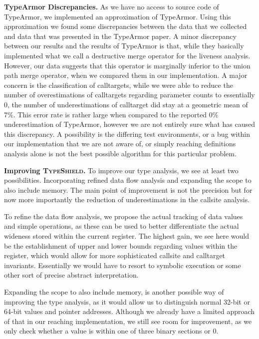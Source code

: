 \textbf{TypeArmor Discrepancies.}
\label{section:discrep}
As we have no access to source code of TypeArmor, we implemented an approximation
of TypeArmor. Using this approximation we found some discrepancies between the data that we collected
and data that was presented in the TypeArmor paper.
A minor discrepancy between our results and the results of TypeArmor is that, while they basically implemented
what we call a destructive merge operator for the liveness analysis. However, our data suggests that this
operator is marginally inferior to the union path merge operator, when we compared them in our implementation.
A major concern is the classification of calltargets, while we were able to reduce the number of overestimations
of calltargets regarding parameter counts to essentially 0, the number of underestimations of calltarget did
stay at a geometric mean of 7\%. This error rate is rather large when compared to the reported 0\% underestimation
of TypeArmor, however we are not entirely sure what has caused this discrepancy. A possibility is the differing
test environments, or a bug within our implementation that we are not aware of, or simply reaching definitions
analysis alone is not the best possible algorithm for this particular problem.

\textbf{Improving \textsc{TypeShield}.}
\label{section:venuesimp}
To improve our type analysis, we see at least two possibilities. Incorporating refined data flow analysis and 
expanding the scope to also include memory. The main point of improvement is not the precision but for now 
more importantly the reduction of underestimations in the callsite analysis.

To refine the data flow analysis, we propose the actual tracking of data values and simple operations, as these
can be used to better differentiate the actual wideness stored within the current register. The highest gain, 
we see here would be the establishment of upper and lower bounds regarding values within the register, which 
would allow for more sophisticated callsite and calltarget invariants. Essentially we would have to resort 
to symbolic execution or some other sort of precise abstract interpretation.

Expanding the scope to also include memory, is another possible way of improving the type analysis, as it 
would allow us to distinguish normal 32-bit or 64-bit values and pointer addresses. Although we already have a 
limited approach of that in our reaching implementation, we still see room for improvement, as we only check
whether a value is within one of three binary sections or 0.

